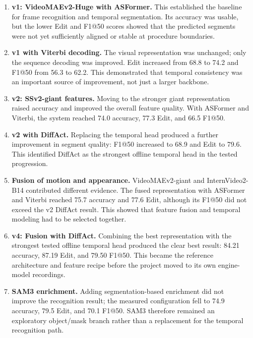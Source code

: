 \begin{enumerate}
    \item \textbf{v1: VideoMAEv2-Huge with ASFormer.} This established the
    baseline for frame recognition and temporal segmentation. Its accuracy was
    usable, but the lower Edit and F1@50 scores showed that the predicted
    segments were not yet sufficiently aligned or stable at procedure
    boundaries.
    \item \textbf{v1 with Viterbi decoding.} The visual representation was
    unchanged; only the sequence decoding was improved. Edit increased from
    68.8 to 74.2 and F1@50 from 56.3 to 62.2. This demonstrated that temporal
    consistency was an important source of improvement, not just a larger
    backbone.
    \item \textbf{v2: SSv2-giant features.} Moving to the stronger giant
    representation raised accuracy and improved the overall feature quality.
    With ASFormer and Viterbi, the system reached 74.0 accuracy, 77.3 Edit,
    and 66.5 F1@50.
    \item \textbf{v2 with DiffAct.} Replacing the temporal head produced a
    further improvement in segment quality: F1@50 increased to 68.9 and Edit
    to 79.6. This identified DiffAct as the strongest offline temporal head in
    the tested progression.
    \item \textbf{Fusion of motion and appearance.} VideoMAEv2-giant and
    InternVideo2-B14 contributed different evidence. The fused representation
    with ASFormer and Viterbi reached 75.7 accuracy and 77.6 Edit, although its
    F1@50 did not exceed the v2 DiffAct result. This showed that feature fusion
    and temporal modeling had to be selected together.
    \item \textbf{v4: Fusion with DiffAct.} Combining the best representation
    with the strongest tested offline temporal head produced the clear best
    result: 84.21 accuracy, 87.19 Edit, and 79.50 F1@50. This became the
    reference architecture and feature recipe before the project moved to its
    own engine-model recordings.
    \item \textbf{SAM3 enrichment.} Adding segmentation-based enrichment did
    not improve the recognition result; the measured configuration fell to
    74.9 accuracy, 79.5 Edit, and 70.1 F1@50. SAM3 therefore remained an
    exploratory object/mask branch rather than a replacement for the temporal
    recognition path.
\end{enumerate}

